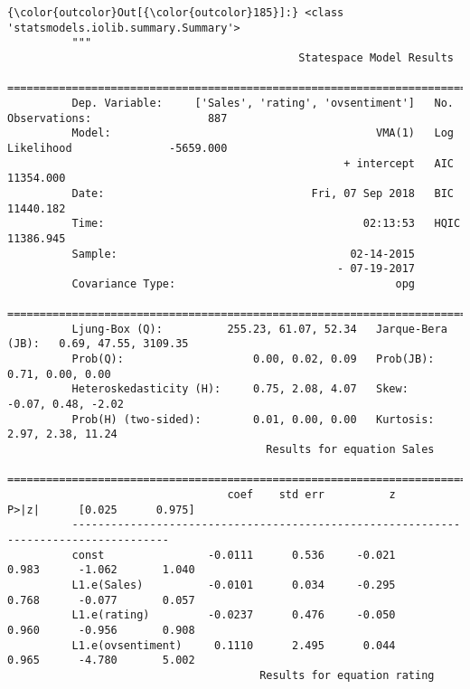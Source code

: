 \documentclass[11pt]{article}
\begin{document}
\begin{Verbatim}[commandchars=\\\{\}]
{\color{outcolor}Out[{\color{outcolor}185}]:} <class 'statsmodels.iolib.summary.Summary'>
          """
                                             Statespace Model Results                                   
          ==============================================================================================
          Dep. Variable:     ['Sales', 'rating', 'ovsentiment']   No. Observations:                  887
          Model:                                         VMA(1)   Log Likelihood               -5659.000
                                                    + intercept   AIC                          11354.000
          Date:                                Fri, 07 Sep 2018   BIC                          11440.182
          Time:                                        02:13:53   HQIC                         11386.945
          Sample:                                    02-14-2015                                         
                                                   - 07-19-2017                                         
          Covariance Type:                                  opg                                         
          =======================================================================================
          Ljung-Box (Q):          255.23, 61.07, 52.34   Jarque-Bera (JB):   0.69, 47.55, 3109.35
          Prob(Q):                    0.00, 0.02, 0.09   Prob(JB):               0.71, 0.00, 0.00
          Heteroskedasticity (H):     0.75, 2.08, 4.07   Skew:                 -0.07, 0.48, -2.02
          Prob(H) (two-sided):        0.01, 0.00, 0.00   Kurtosis:              2.97, 2.38, 11.24
                                        Results for equation Sales                             
          =====================================================================================
                                  coef    std err          z      P>|z|      [0.025      0.975]
          -------------------------------------------------------------------------------------
          const                -0.0111      0.536     -0.021      0.983      -1.062       1.040
          L1.e(Sales)          -0.0101      0.034     -0.295      0.768      -0.077       0.057
          L1.e(rating)         -0.0237      0.476     -0.050      0.960      -0.956       0.908
          L1.e(ovsentiment)     0.1110      2.495      0.044      0.965      -4.780       5.002
                                       Results for equation rating                             

\end{Verbatim}
\end{document}
